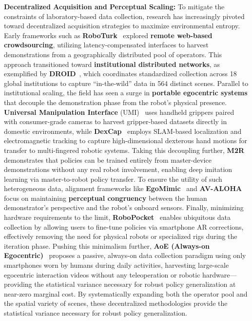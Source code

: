 \documentclass[acmsmall,screen,review,anonymous]{acmart}
\begin{document}
\textbf{Decentralized Acquisition and Perceptual Scaling:} 
To mitigate the constraints of laboratory-based data collection, research has increasingly pivoted toward decentralized acquisition strategies to maximize environmental entropy. Early frameworks such as \textbf{RoboTurk}~\cite{mandlekar2018roboturk} explored \textbf{remote web-based crowdsourcing}, utilizing latency-compensated interfaces to harvest demonstrations from a geographically distributed pool of operators. This approach transitioned toward \textbf{institutional distributed networks}, as exemplified by \textbf{DROID}~\cite{khazatsky2024droid}, which coordinates standardized collection across 18 global institutions to capture ``in-the-wild'' data in 564 distinct scenes. Parallel to institutional scaling, the field has seen a surge in \textbf{portable egocentric systems} that decouple the demonstration phase from the robot's physical presence. \textbf{Universal Manipulation Interface} (UMI)~\cite{chi2024umi} uses handheld grippers paired with consumer-grade cameras to harvest gripper-based datasets directly in domestic environments, while \textbf{DexCap}~\cite{wang2024dexcap} employs SLAM-based localization and electromagnetic tracking to capture high-dimensional dexterous hand motions for transfer to multi-fingered robotic systems. Taking this decoupling further, \textbf{M2R}~\cite{kim2024m2r} demonstrates that policies can be trained entirely from master-device demonstrations without any real robot involvement, enabling deep imitation learning via master-to-robot policy transfer. To ensure the utility of such heterogeneous data, alignment frameworks like \textbf{EgoMimic}~\cite{egomimic2024} and \textbf{AV-ALOHA}~\cite{chuang2025avaloha} focus on maintaining \textbf{perceptual congruency} between the human demonstrator's perspective and the robot's onboard sensors. 
Finally, minimizing hardware requirements to the limit, \textbf{RoboPocket}~\cite{fang2026robopocket} enables ubiquitous data collection by allowing users to fine-tune policies via smartphone AR corrections, effectively removing the need for physical robots or specialized rigs during the iteration phase. Pushing this minimalism further, \textbf{AoE (Always-on Egocentric)}~\cite{yang2026aoe} proposes a passive, always-on data collection paradigm using only smartphones worn by humans during daily activities, harvesting large-scale egocentric interaction videos without any teleoperation or robotic hardware---providing the statistical variance necessary for robust policy generalization at near-zero marginal cost. By systematically expanding both the operator pool and the spatial variety of scenes, these decentralized methodologies provide the statistical variance necessary for robust policy generalization.
\end{document}
